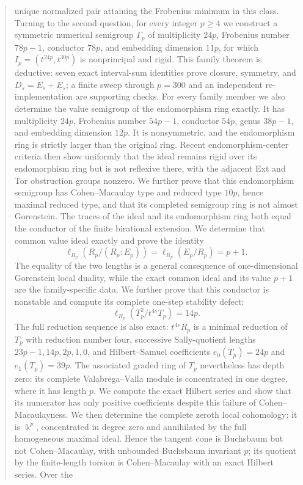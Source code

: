 \documentclass[11pt]{article}
\theoremstyle{definition}
\theoremstyle{remark}
\newcommand{\kfield}{\Bbbk}
\begin{document}
\begin{abstract}
unique normalized pair attaining the Frobenius minimum in this class. Turning to the second
question, for every integer $p\ge4$ we construct a symmetric numerical semigroup $\Gamma_p$ of
multiplicity $24p$, Frobenius number $78p-1$, conductor $78p$, and embedding dimension $11p$, for
which $I_p=(t^{24p},t^{30p})$ is nonprincipal and rigid. This family theorem is deductive: seven exact
interval-sum identities prove closure, symmetry, and $D_s=E_s+E_s$; a finite sweep through
$p=300$ and an independent re-implementation are supporting checks. For every family member we
also determine the value semigroup of the endomorphism ring exactly. It has multiplicity $24p$,
Frobenius number $54p-1$, conductor $54p$, genus $38p-1$, and embedding dimension $12p$.
It is nonsymmetric, and the endomorphism ring is strictly larger than the original ring. Recent
endomorphism-center criteria then show uniformly that the ideal remains rigid over its
endomorphism ring but is not reflexive there, with the adjacent Ext and Tor obstruction groups
nonzero. We further prove that this endomorphism semigroup has Cohen--Macaulay type and reduced
type $10p$, hence maximal reduced type, and that its completed semigroup ring is not almost
Gorenstein. The traces of the ideal and its endomorphism ring both equal the conductor of
the finite birational extension. We determine that common value ideal exactly and prove the
identity
\[
\ell_{R_p}(R_p/(R_p:E_p))=\ell_{R_p}(E_p/R_p)=p+1.
\]
The equality of the two lengths is a general consequence of one-dimensional Gorenstein local
duality, while the exact common ideal and its value $p+1$ are the family-specific data. We further
prove that this conductor is nonstable and compute its complete one-step stability defect:
\[
\ell_{R_p}(T_p^2/t^{4s}T_p)=14p.
\]
The full reduction sequence is also exact: $t^{4s}R_p$ is a minimal reduction of $T_p$ with
reduction number four, successive Sally-quotient lengths
$23p-1,14p,2p,1,0$, and Hilbert--Samuel coefficients $e_0(T_p)=24p$ and $e_1(T_p)=39p$.
The associated graded ring of $T_p$ nevertheless has depth zero: its complete
Valabrega--Valla module is concentrated in one degree, where it has length $p$. We compute
the exact Hilbert series and show that its numerator has only positive coefficients despite this
failure of Cohen--Macaulayness. We then determine the complete zeroth local cohomology: it is
$\kfield^p$, concentrated in degree zero and annihilated by the full homogeneous maximal ideal. Hence
the tangent cone is Buchsbaum but not Cohen--Macaulay, with unbounded Buchsbaum invariant $p$;
its quotient by the finite-length torsion is Cohen--Macaulay with an exact Hilbert series. Over the

\end{abstract}
\end{document}
